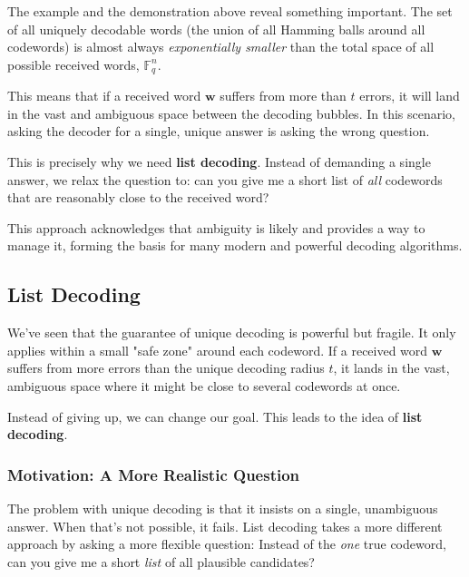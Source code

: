 \documentclass{article}
\begin{document}
The example and the demonstration above reveal something important. The set of all uniquely decodable words (the union of all Hamming balls around all codewords) is almost always \textit{exponentially smaller} than the total space of all possible received words, $\mathbb{F}_q^n$.

This means that if a received word $\mathbf{w}$ suffers from more than $t$ errors, it will land in the vast and ambiguous space between the decoding bubbles. In this scenario, asking the decoder for a single, unique answer is asking the wrong question.

This is precisely why we need \textbf{list decoding}. Instead of demanding a single answer, we relax the question to: can you give me a short list of \textit{all} codewords that are reasonably close to the received word?

This approach acknowledges that ambiguity is likely and provides a way to manage it, forming the basis for many modern and powerful decoding algorithms.





\subsection{List Decoding}

We've seen that the guarantee of unique decoding is powerful but fragile. It only applies within a small "safe zone" around each codeword. If a received word $\mathbf{w}$ suffers from more errors than the unique decoding radius $t$, it lands in the vast, ambiguous space where it might be close to several codewords at once.

Instead of giving up, we can change our goal. This leads to the idea of \textbf{list decoding}.

\subsubsection{Motivation: A More Realistic Question}
The problem with unique decoding is that it insists on a single, unambiguous answer. When that's not possible, it fails. List decoding takes a more different approach by asking a more flexible question: Instead of the \textit{one} true codeword, can you give me a short \textit{list} of all plausible candidates?
\end{document}
